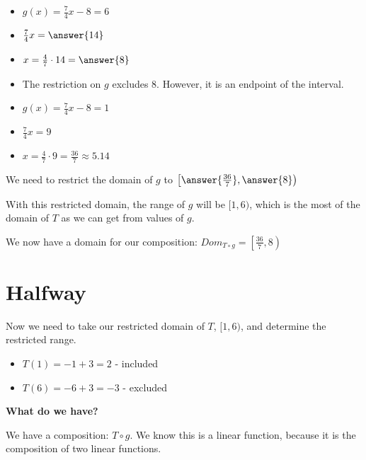 \documentclass{ximera}
\begin{document}
\begin{itemize}
\item $g(x) = \frac{7}{4}x-8 = 6$
\item $\frac{7}{4}x = \answer{14}$
\item $x = \frac{4}{7} \cdot 14 = \answer{8}$
\item The restriction on $g$ excludes $8$.  However, it is an endpoint of the interval.
\end{itemize}


\begin{itemize}
\item $g(x) = \frac{7}{4}x-8 = 1$
\item $\frac{7}{4}x = 9$
\item $x = \frac{4}{7} \cdot 9 = \frac{36}{7} \approx 5.14$
\end{itemize}



We need to restrict the domain of $g$ to $\left[ \answer{\frac{36}{7}}, \answer{8} \right)$


With this restricted domain, the range of $g$ will be $[1, 6)$, which is the most of the domain of $T$ as we can get from values of $g$.

We now have a domain for our composition: $Dom_{T \circ g} = \left[\frac{36}{7}, 8\right)$



\section{Halfway}



Now we need to take our restricted domain of $T$, $[1, 6)$, and determine the restricted range.



\begin{itemize}
\item $T(1) = -1+3 = 2$ - included\\
\item $T(6) = -6+3 = -3$ - excluded \\
\end{itemize}







\textbf{What do we have?}


We have a composition: $T \circ g$.  We know this is a linear function, because it is the composition of two linear functions. \\
\end{document}
